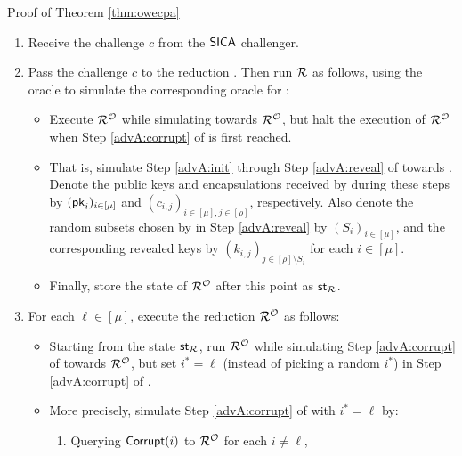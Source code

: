 \begin{namedproof}{Proof of Theorem \ref{thm:owecpa}}
  \begin{enumerate}[itemsep=0.1cm]
    \item Receive the challenge \(c\) from the \(\mathsf{SICA}\) challenger.
    \item Pass the challenge \(c\) to the reduction \redR. Then run \(\redR\) as follows,
          using the oracle \oracle to simulate the corresponding oracle for \redR:
          \begin{itemize}[label={\textbullet},itemsep=0.1cm]
            \item Execute \(\redR^{\oracle}\) while simulating \advA towards \(\redR^{\oracle}\),
                  but halt the execution of \(\redR^{\oracle}\)
                  when Step \ref{advA:corrupt} of \advA is first reached.
            \item That is, simulate Step \ref{advA:init} through Step \ref{advA:reveal} of \advA towards \redR.
                  Denote the public keys and encapsulations
                  received by \advA during these steps by \((\mathsf{pk}_{i})_{i \in [\mu]}\) and
                  \((c_{i,j})_{i \in [\mu], j \in [\rho]}\), respectively.
                  Also denote the random subsets chosen by \advA in Step \ref{advA:reveal}
                  by \((S_{i})_{i \in [\mu]}\),
                  and the corresponding revealed keys by \((k_{i,j})_{j \in [\rho] \setminus S_{i}}\)
                  for each \(i \in [\mu]\).
            \item Finally, store the state of \(\redR^{\oracle}\) after this point as \(\state_{\redR}\).
          \end{itemize}
    \item\label{advM:rewind}
          For each \(\ell \in [\mu]\), execute the reduction \(\redR^{\oracle}\) as follows:
          \begin{itemize}[label={\textbullet},itemsep=0.1cm]
            \item Starting from the state \(\state_{\redR}\),
                  run \(\redR^{\oracle}\) while simulating Step
                  \ref{advA:corrupt} of \advA towards \(\redR^{\oracle}\),
                  but set \(i^{*} = \ell\) (instead of picking a random \(i^{*}\))
                  in Step \ref{advA:corrupt} of \advA.
            \item More precisely, simulate Step \ref{advA:corrupt} of \advA with \(i^{*} = \ell\) by:
                  \begin{enumerate}[topsep=0.1cm,itemsep=0.1cm,ref=(\alph*)]
                    \item Querying \(\mathsf{Corrupt}(i)\) to \(\redR^{\oracle}\) for each \(i \ne \ell\),

\end{enumerate}
\end{itemize}
\end{enumerate}
\end{namedproof}
